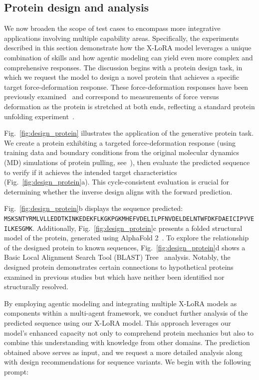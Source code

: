 \subsection{Protein design and analysis}

We now broaden the scope of test cases to encompass more integrative applications involving multiple capability areas. Specifically, the experiments described in this section demonstrate how the X-LoRA model leverages a unique combination of skills and how agentic modeling can yield even more complex and comprehensive responses. The discussion begins with a protein design task, in which we request the model to design a novel protein that achieves a specific target force-deformation response. These force-deformation responses have been previously examined~\cite{Ni2023ForceGen:Model} and correspond to measurements of force versus deformation as the protein is stretched at both ends, reflecting a standard protein unfolding experiment~\cite{Lu1998UnfoldingSimulation.}.

Fig.~\ref{fig:design_protein} illustrates the application of the generative protein task. We create a protein exhibiting a targeted force-deformation response (using training data and boundary conditions from the original molecular dynamics (MD) simulations of protein pulling, see~\cite{Ni2023ForceGen:Model}), then evaluate the predicted sequence to verify if it achieves the intended target characteristics (Fig.~\ref{fig:design_protein}a). This cycle-consistent evaluation is crucial for determining whether the inverse design aligns with the forward prediction.

Fig.~\ref{fig:design_protein}b displays the sequence predicted: \texttt{MSKSNTYRMLVLLEDDTKINKEDEKFLKGKPGKMHEFVDELILPFNVDELDELNTWFDKFDAEICIPYVEILKESGMK}. Additionally, Fig.~\ref{fig:design_protein}c presents a folded structural model of the protein, generated using AlphaFold 2~\cite{Jumper2021HighlyAlphaFoldb}. To explore the relationship of the designed protein to known sequences, Fig.~\ref{fig:design_protein}d shows a Basic Local Alignment Search Tool (BLAST) Tree~\cite{Altschul1990BasicTool} analysis. Notably, the designed protein demonstrates certain connections to hypothetical proteins examined in previous studies but which have neither been identified nor structurally resolved.

By employing agentic modeling and integrating multiple X-LoRA models as components within a multi-agent framework, we conduct further analysis of the predicted sequence using our X-LoRA model. This approach leverages our model’s enhanced capacity not only to comprehend protein mechanics but also to combine this understanding with knowledge from other domains. The prediction obtained above serves as input, and we request a more detailed analysis along with design recommendations for sequence variants. We begin with the following prompt:

